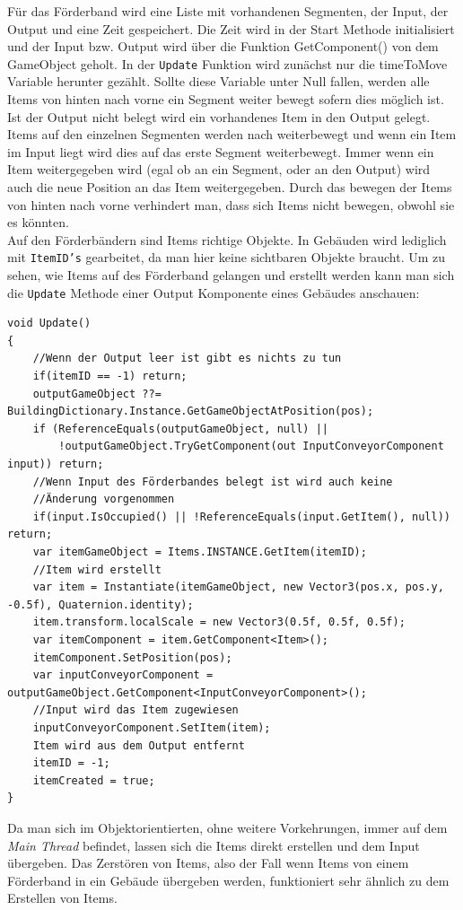 Für das Förderband wird eine Liste mit vorhandenen Segmenten, der Input, der Output und eine Zeit gespeichert. Die Zeit wird in der Start Methode initialisiert und der Input bzw. Output wird über die Funktion \glqq GetComponent()\grqq{} von dem GameObject geholt. In der \texttt{Update} Funktion wird zunächst nur die timeToMove Variable herunter gezählt. Sollte diese Variable unter Null fallen, werden alle Items von hinten nach vorne ein Segment weiter bewegt sofern dies möglich ist. Ist der Output nicht belegt wird ein vorhandenes Item in den Output gelegt. Items auf den einzelnen Segmenten werden nach weiterbewegt und wenn ein Item im Input liegt wird dies auf das erste Segment weiterbewegt. Immer wenn ein Item weitergegeben wird (egal ob an ein Segment, oder an den Output) wird auch die neue Position an das Item weitergegeben. Durch das bewegen der Items von hinten nach vorne verhindert man, dass sich Items nicht bewegen, obwohl sie es könnten.\\
Auf den Förderbändern sind Items richtige Objekte. In Gebäuden wird lediglich mit \texttt{ItemID's} gearbeitet, da man hier keine sichtbaren Objekte braucht. Um zu sehen, wie Items auf des Förderband gelangen und erstellt werden kann man sich die \texttt{Update} Methode einer Output Komponente eines Gebäudes anschauen:
\begin{lstlisting}[style=code, caption={Create Item OOP}]
void Update()
{
    //Wenn der Output leer ist gibt es nichts zu tun
    if(itemID == -1) return;
    outputGameObject ??= BuildingDictionary.Instance.GetGameObjectAtPosition(pos);
    if (ReferenceEquals(outputGameObject, null) ||
        !outputGameObject.TryGetComponent(out InputConveyorComponent input)) return;
    //Wenn Input des Förderbandes belegt ist wird auch keine
    //Änderung vorgenommen
    if(input.IsOccupied() || !ReferenceEquals(input.GetItem(), null)) return;
    var itemGameObject = Items.INSTANCE.GetItem(itemID);
    //Item wird erstellt
    var item = Instantiate(itemGameObject, new Vector3(pos.x, pos.y, -0.5f), Quaternion.identity);
    item.transform.localScale = new Vector3(0.5f, 0.5f, 0.5f);
    var itemComponent = item.GetComponent<Item>();
    itemComponent.SetPosition(pos);
    var inputConveyorComponent = outputGameObject.GetComponent<InputConveyorComponent>();
    //Input wird das Item zugewiesen
    inputConveyorComponent.SetItem(item);
    Item wird aus dem Output entfernt
    itemID = -1;
    itemCreated = true;
}
\end{lstlisting}
Da man sich im Objektorientierten, ohne weitere Vorkehrungen, immer auf dem \textit{Main Thread} befindet, lassen sich die Items direkt erstellen und dem Input übergeben. Das Zerstören von Items, also der Fall wenn Items von einem Förderband in ein Gebäude übergeben werden, funktioniert sehr ähnlich zu dem Erstellen von Items.